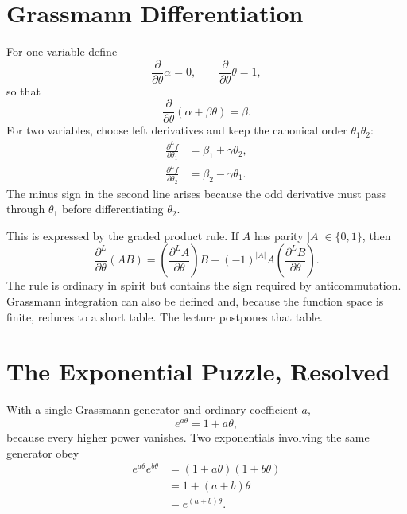 \section{Grassmann Differentiation}

For one variable define
\begin{equation}
\frac{\partial}{\partial\theta}\alpha=0,
\qquad
\frac{\partial}{\partial\theta}\theta=1,
\end{equation}
so that
\begin{equation}
\frac{\partial}{\partial\theta}
(\alpha+\beta\theta)=\beta.
\end{equation}
For two variables, choose left derivatives and keep the canonical order \(\theta_1\theta_2\):
\begin{align}
\frac{\partial^L f}{\partial\theta_1}
&=\beta_1+\gamma\theta_2,\\
\frac{\partial^L f}{\partial\theta_2}
&=\beta_2-\gamma\theta_1.
\end{align}
The minus sign in the second line arises because the odd derivative must pass through \(\theta_1\) before differentiating \(\theta_2\).

This is expressed by the graded product rule. If \(A\) has parity \(|A|\in\{0,1\}\), then
\begin{equation}
\frac{\partial^L}{\partial\theta}(AB)
=\left(\frac{\partial^L A}{\partial\theta}\right)B
+(-1)^{|A|}A
\left(\frac{\partial^L B}{\partial\theta}\right).
\end{equation}
The rule is ordinary in spirit but contains the sign required by anticommutation. Grassmann integration can also be defined and, because the function space is finite, reduces to a short table. The lecture postpones that table.

\section{The Exponential Puzzle, Resolved}

With a single Grassmann generator and ordinary coefficient \(a\),
\begin{equation}
e^{a\theta}
=1+a\theta,
\end{equation}
because every higher power vanishes. Two exponentials involving the same generator obey
\begin{align}
e^{a\theta}e^{b\theta}
&=(1+a\theta)(1+b\theta)\\
&=1+(a+b)\theta\\
&=e^{(a+b)\theta}.
\end{align}

